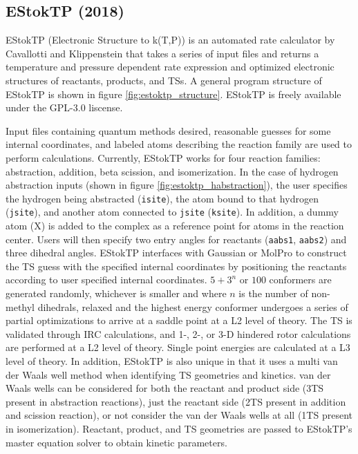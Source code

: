 \documentclass[preprint, 11pt]{elsarticle} %
\begin{document}
\subsection{EStokTP (2018)}


EStokTP (Electronic Structure to k(T,P)) \cite{Cavallotti:2019jctc} is an automated rate calculator by Cavallotti and Klippenstein that takes a series of input files and returns a temperature and pressure dependent rate expression and optimized electronic structures of reactants, products, and TSs.
A general program structure of EStokTP is shown in figure \ref{fig:estoktp_structure}.
EStokTP is freely available under the GPL-3.0 liscense.

Input files containing quantum methods desired, reasonable guesses for some internal coordinates, and labeled atoms describing the reaction family are used to perform calculations.
Currently, EStokTP works for four reaction families: abstraction, addition, beta scission, and isomerization. 
In the case of hydrogen abstraction inputs (shown in figure \ref{fig:estoktp_habstraction}), the user specifies the hydrogen being abstracted (\texttt{isite}), the atom bound to that hydrogen (\texttt{jsite}), and another atom connected to \texttt{jsite} (\texttt{ksite}).
In addition, a dummy atom (X) is added to the complex as a reference point for atoms in the reaction center.
Users will then specify two entry angles for reactants (\texttt{aabs1}, \texttt{aabs2}) and three dihedral angles.
EStokTP interfaces with Gaussian \cite{Gaussian:2009} or MolPro \cite{molpro:2012} to construct the TS guess with the specified internal coordinates by positioning the reactants according to user specified internal coordinates. 
$5 + 3^n$ or $100$ conformers are generated randomly, whichever is smaller and where $n$ is the number of non-methyl dihedrals, relaxed and the highest energy conformer undergoes a series of partial optimizations to arrive at a saddle point at a L2 level of theory. 
The TS is validated  through IRC calculations, and 1-, 2-, or 3-D hindered rotor calculations are performed at a L2 level of theory.
Single point energies are calculated at a L3 level of theory.
In addition, EStokTP is also unique in that it uses a multi van der Waals well method when identifying TS geometries and kinetics.
van der Waals wells can be considered for both the reactant and product side (3TS present in abstraction reactions), just the reactant side (2TS present in addition and scission reaction), or not consider the van der Waals wells at all (1TS present in isomerization).
Reactant, product, and TS geometries are passed to EStokTP's master equation solver to obtain kinetic parameters.
\end{document}
